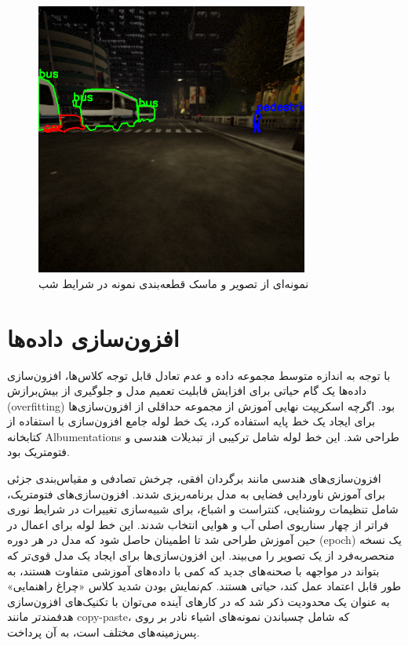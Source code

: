 \documentclass[oneside]{report}
\begin{document}
\begin{figure}[H]
  \centering
  \includegraphics[width=0.8\textwidth]{images/data2/sample_8_night_000088.png}
  \caption{نمونه‌ای از تصویر و ماسک قطعه‌بندی نمونه در شرایط شب}
\end{figure}

\chapter{افزون‌سازی داده‌ها}
با توجه به اندازه متوسط مجموعه داده و عدم تعادل قابل توجه کلاس‌ها، افزون‌سازی داده‌ها یک گام حیاتی برای افزایش قابلیت تعمیم مدل و جلوگیری از بیش‌برازش (overfitting) بود. اگرچه اسکریپت نهایی آموزش از مجموعه حداقلی از افزون‌سازی‌ها برای ایجاد یک خط پایه استفاده کرد، یک خط لوله جامع افزون‌سازی با استفاده از کتابخانه Albumentations طراحی شد. این خط لوله شامل ترکیبی از تبدیلات هندسی و فتومتریک بود.

افزون‌سازی‌های هندسی مانند برگردان افقی، چرخش تصادفی و مقیاس‌بندی جزئی برای آموزش ناوردایی فضایی به مدل برنامه‌ریزی شدند. افزون‌سازی‌های فتومتریک، شامل تنظیمات روشنایی، کنتراست و اشباع، برای شبیه‌سازی تغییرات در شرایط نوری فراتر از چهار سناریوی اصلی آب و هوایی انتخاب شدند. این خط لوله برای اعمال در حین آموزش طراحی شد تا اطمینان حاصل شود که مدل در هر دوره (epoch) یک نسخه منحصربه‌فرد از یک تصویر را می‌بیند. این افزون‌سازی‌ها برای ایجاد یک مدل قوی‌تر که بتواند در مواجهه با صحنه‌های جدید که کمی با داده‌های آموزشی متفاوت هستند، به طور قابل اعتماد عمل کند، حیاتی هستند. کم‌نمایش بودن شدید کلاس «چراغ راهنمایی» به عنوان یک محدودیت ذکر شد که در کارهای آینده می‌توان با تکنیک‌های افزون‌سازی هدفمندتر مانند copy-paste، که شامل چسباندن نمونه‌های اشیاء نادر بر روی پس‌زمینه‌های مختلف است، به آن پرداخت.
\end{document}
